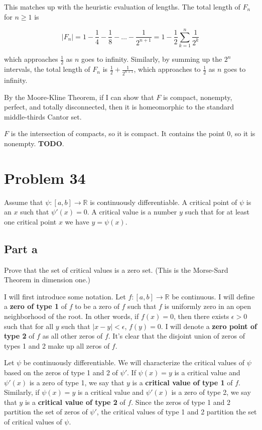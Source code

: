 \documentclass{article}
\newcommand{\R}{\mathbb{R}}
\begin{document}
This matches up with the heuristic evaluation of lengths. The total length of $F_n$ for $n \geq 1$ is

\[
|F_n| = 1 - \frac{1}{4} - \frac{1}{8} - \dots - \frac{1}{2^{n+1}} = 1 - \frac{1}{2} \sum_{k=1}^n \frac{1}{2^k}
\]

which approaches $\frac{1}{2}$ as $n$ goes to infinity. Similarly, by summing up the $2^n$ intervals, the total length of $F_n$ is $\frac{1}{2} + \frac{1}{2^{n+1}}$, which approaches to $\frac{1}{2}$ as $n$ goes to infinity.

By the Moore-Kline Theorem, if I can show that $F$ is compact, nonempty, perfect, and totally disconnected, then it is homeomorphic to the standard middle-thirds Cantor set.

$F$ is the intersection of compacts, so it is compact. It contains the point $0$, so it is nonempty. \textbf{TODO}.

\section*{Problem 34}

Assume that $\psi: [a, b] \rightarrow \R$ is continuously differentiable. A critical point of $\psi$ is an $x$ such that $\psi'(x) = 0$. A critical value is a number $y$ such that for at least one critical point $x$ we have $y = \psi(x)$.

\subsection*{Part a}

Prove that the set of critical values is a zero set. (This is the Morse-Sard Theorem in dimension one.)

I will first introduce some notation. Let $f: [a, b] \rightarrow \R$ be continuous. I will define a \textbf{zero of type 1} of $f$ to be a zero of $f$ such that $f$ is uniformly zero in an open neighborhood of the root. In other words, if $f(x) = 0$, then there exists $\epsilon > 0$ such that for all $y$ such that $|x-y| < \epsilon$, $f(y) = 0$. I will denote a \textbf{zero point of type 2} of $f$ as all other zeros of $f$. It's clear that the disjoint union of zeros of types 1 and 2 make up all zeros of $f$.

Let $\psi$ be continuously differentiable. We will characterize the critical values of $\psi$ based on the zeros of type 1 and 2 of $\psi'$. If $\psi(x) = y$ is a critical value and $\psi'(x)$ is a zero of type 1, we say that $y$ is a \textbf{critical value of type 1} of $f$. Similarly, if $\psi(x) = y$ is a critical value and $\psi'(x)$ is a zero of type 2, we say that $y$ is a \textbf{critical value of type 2} of $f$. Since the zeros of type 1 and 2 partition the set of zeros of $\psi'$, the critical values of type 1 and 2 partition the set of critical values of $\psi$.
\end{document}
